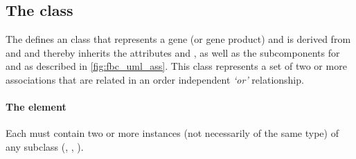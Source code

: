 
\subsection{The \FBC {} class}
\label{or-class}

The \FBCPackage defines an \GeneOr class that represents a gene (or gene product) and is derived from and \Association and thereby inherits the \SBase attributes  and , as well as the subcomponents for \Annotation and \Notes as described in \ref{fig:fbc_uml_ass}. This class represents a set of two or more associations that are related in an order independent \emph{`or'} relationship.

\paragraph{The  element}
Each \GeneOr must contain two or more instances (not necessarily of the same type) of any \Association subclass (\GeneAnd, \GeneOr, \Gene).
%



